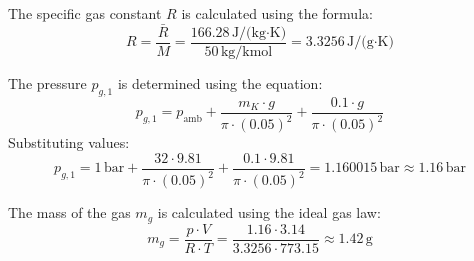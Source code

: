 The specific gas constant \( R \) is calculated using the formula:  
\[
R = \frac{\bar{R}}{M} = \frac{166.28 \, \text{J/(kg·K)}}{50 \, \text{kg/kmol}} = 3.3256 \, \text{J/(g·K)}
\]  

The pressure \( p_{g,1} \) is determined using the equation:  
\[
p_{g,1} = p_{\text{amb}} + \frac{m_K \cdot g}{\pi \cdot (0.05)^2} + \frac{0.1 \cdot g}{\pi \cdot (0.05)^2}
\]  
Substituting values:  
\[
p_{g,1} = 1 \, \text{bar} + \frac{32 \cdot 9.81}{\pi \cdot (0.05)^2} + \frac{0.1 \cdot 9.81}{\pi \cdot (0.05)^2} = 1.160015 \, \text{bar} \approx 1.16 \, \text{bar}
\]  

The mass of the gas \( m_g \) is calculated using the ideal gas law:  
\[
m_g = \frac{p \cdot V}{R \cdot T} = \frac{1.16 \cdot 3.14}{3.3256 \cdot 773.15} \approx 1.42 \, \text{g}
\]